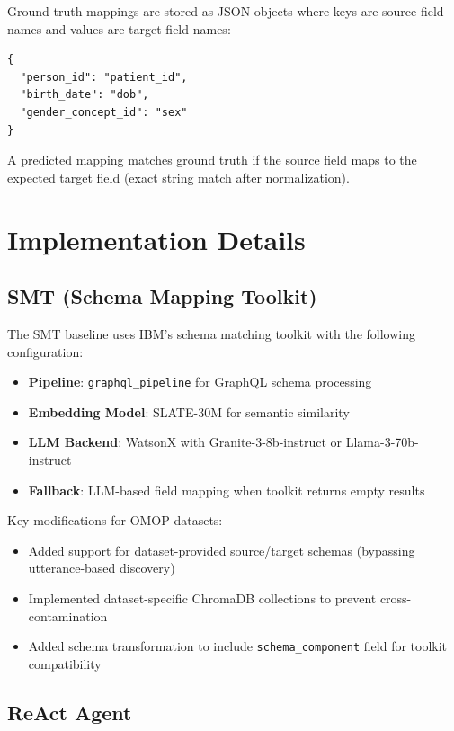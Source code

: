 \documentclass[sigconf, nonacm]{acmart}
\begin{document}
Ground truth mappings are stored as JSON objects where keys are source field names and values are target field names:

\begin{verbatim}
{
  "person_id": "patient_id",
  "birth_date": "dob",
  "gender_concept_id": "sex"
}
\end{verbatim}

A predicted mapping matches ground truth if the source field maps to the expected target field (exact string match after normalization).

\section{Implementation Details}
\label{app:implementation}

\subsection{SMT (Schema Mapping Toolkit)}

The SMT baseline uses IBM's schema matching toolkit with the following configuration:

\begin{itemize}
    \item \textbf{Pipeline}: \texttt{graphql\_pipeline} for GraphQL schema processing
    \item \textbf{Embedding Model}: SLATE-30M for semantic similarity
    \item \textbf{LLM Backend}: WatsonX with Granite-3-8b-instruct or Llama-3-70b-instruct
    \item \textbf{Fallback}: LLM-based field mapping when toolkit returns empty results
\end{itemize}

Key modifications for OMOP datasets:
\begin{itemize}
    \item Added support for dataset-provided source/target schemas (bypassing utterance-based discovery)
    \item Implemented dataset-specific ChromaDB collections to prevent cross-contamination
    \item Added schema transformation to include \texttt{schema\_component} field for toolkit compatibility
\end{itemize}

\subsection{ReAct Agent}
\end{document}
